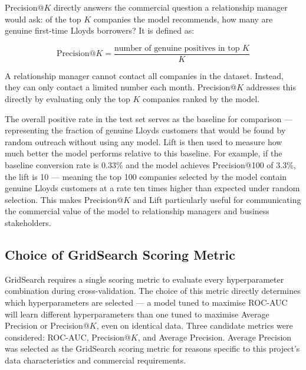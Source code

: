 \documentclass[ %
                    author={Natchalin Iwsakul \\ Inkaphol Siriwongwattana \\ Tanaphan Kummaraphat \\ Patorn Srisupap},
                supervisor={Fernando Moreno-Pino},
                    degree={MSc},
                     title={Propensity Modelling for SME Commercial Lending Using Open Public Data},
                  subtitle={Companies House filings and GDELT media coverage as predictors of first-time borrowing},
                      type={},
                      year={2026}]{dissertation}
\begin{document}
Precision@$K$ directly answers the commercial question a
relationship manager would ask: of the top $K$ companies
the model recommends, how many are genuine first-time
Lloyds borrowers? It is defined as:

\begin{equation}
    \text{Precision@}K =
    \frac{\text{number of genuine positives in top } K}{K}
    \label{eq:pak}
\end{equation}

\noindent
A relationship manager cannot contact all companies in the
dataset. Instead, they can only contact a limited number
each month. Precision@$K$ addresses this directly by
evaluating only the top $K$ companies ranked by the model.

The overall positive rate in the test set serves as the
baseline for comparison --- representing the fraction of
genuine Lloyds customers that would be found by random
outreach without using any model. Lift is then used to
measure how much better the model performs relative to this
baseline. For example, if the baseline conversion rate is
0.33\% and the model achieves Precision@100 of 3.3\%, the
lift is 10 --- meaning the top 100 companies selected by the
model contain genuine Lloyds customers at a rate ten times
higher than expected under random selection. This makes
Precision@$K$ and Lift particularly useful for communicating
the commercial value of the model to relationship managers
and business stakeholders.





\subsection{Choice of GridSearch Scoring Metric}

GridSearch requires a single scoring metric to evaluate
every hyperparameter combination during cross-validation.
The choice of this metric directly determines which
hyperparameters are selected --- a model tuned to maximise
ROC-AUC will learn different hyperparameters than one tuned
to maximise Average Precision or Precision@$K$, even on
identical data. Three candidate metrics were considered:
ROC-AUC, Precision@$K$, and Average Precision.
Average Precision was selected as the GridSearch scoring
metric for reasons specific to this project's data
characteristics and commercial requirements.
\end{document}
